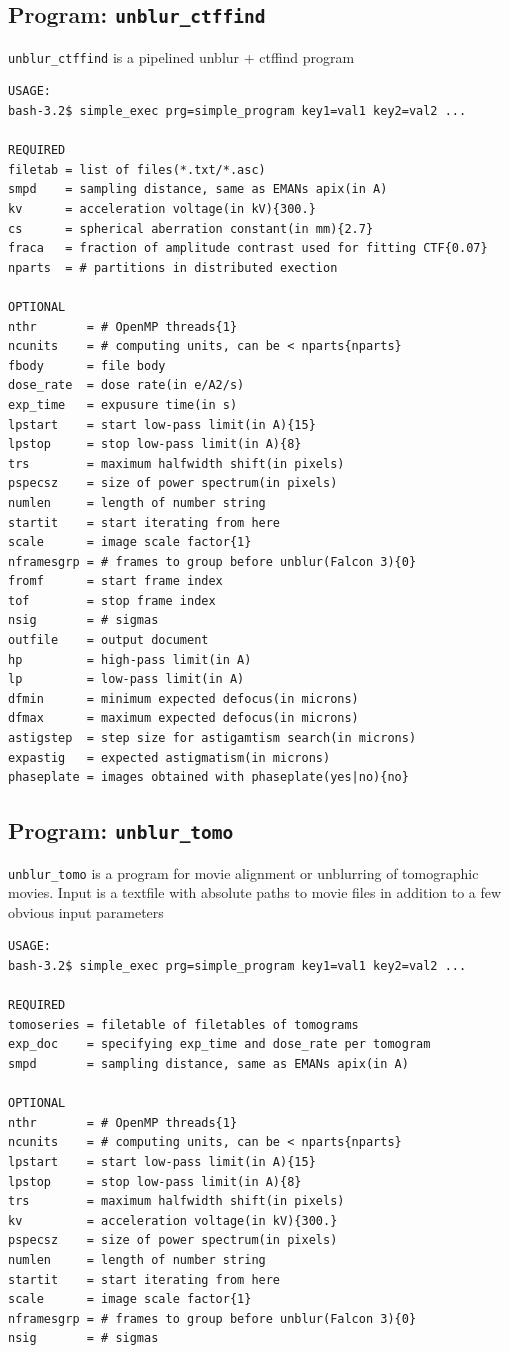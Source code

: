 \documentclass[a4paper,11pt]{article}
\newcommand{\prgname}[1]{\textcolor{NavyBlue}{\texttt{#1}}}
\begin{document}
\subsection{Program: \prgname{unblur\_ctffind}}
\label{unblur_ctffind}
\prgname{unblur\_ctffind} is a pipelined unblur + ctffind program

\begin{verbatim}
USAGE:
bash-3.2$ simple_exec prg=simple_program key1=val1 key2=val2 ...

REQUIRED
filetab = list of files(*.txt/*.asc)
smpd    = sampling distance, same as EMANs apix(in A)
kv      = acceleration voltage(in kV){300.}
cs      = spherical aberration constant(in mm){2.7}
fraca   = fraction of amplitude contrast used for fitting CTF{0.07}
nparts  = # partitions in distributed exection

OPTIONAL
nthr       = # OpenMP threads{1}
ncunits    = # computing units, can be < nparts{nparts}
fbody      = file body
dose_rate  = dose rate(in e/A2/s)
exp_time   = expusure time(in s)
lpstart    = start low-pass limit(in A){15}
lpstop     = stop low-pass limit(in A){8}
trs        = maximum halfwidth shift(in pixels)
pspecsz    = size of power spectrum(in pixels)
numlen     = length of number string
startit    = start iterating from here
scale      = image scale factor{1}
nframesgrp = # frames to group before unblur(Falcon 3){0}
fromf      = start frame index
tof        = stop frame index
nsig       = # sigmas
outfile    = output document
hp         = high-pass limit(in A)
lp         = low-pass limit(in A)
dfmin      = minimum expected defocus(in microns)
dfmax      = maximum expected defocus(in microns)
astigstep  = step size for astigamtism search(in microns)
expastig   = expected astigmatism(in microns)
phaseplate = images obtained with phaseplate(yes|no){no}
\end{verbatim}

\subsection{Program: \prgname{unblur\_tomo}}
\label{unblur_tomo}
\prgname{unblur\_tomo} is a program for movie alignment or unblurring of tomographic movies. Input is a textfile with absolute paths to movie files in addition to a few obvious input parameters

\begin{verbatim}
USAGE:
bash-3.2$ simple_exec prg=simple_program key1=val1 key2=val2 ...

REQUIRED
tomoseries = filetable of filetables of tomograms
exp_doc    = specifying exp_time and dose_rate per tomogram
smpd       = sampling distance, same as EMANs apix(in A)

OPTIONAL
nthr       = # OpenMP threads{1}
ncunits    = # computing units, can be < nparts{nparts}
lpstart    = start low-pass limit(in A){15}
lpstop     = stop low-pass limit(in A){8}
trs        = maximum halfwidth shift(in pixels)
kv         = acceleration voltage(in kV){300.}
pspecsz    = size of power spectrum(in pixels)
numlen     = length of number string
startit    = start iterating from here
scale      = image scale factor{1}
nframesgrp = # frames to group before unblur(Falcon 3){0}
nsig       = # sigmas
\end{verbatim}

\def\bibfont{\footnotesize}


\end{document}

